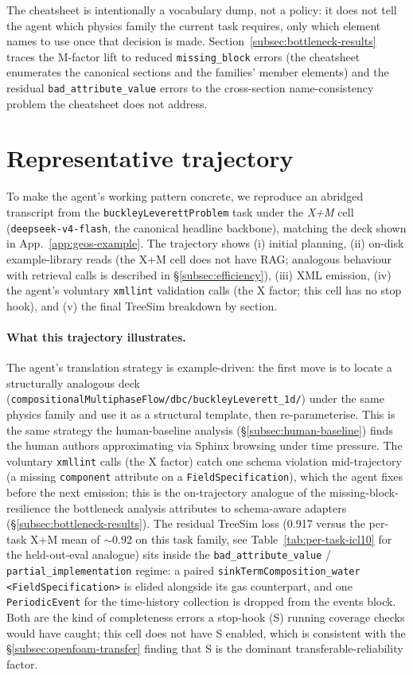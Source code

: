 \documentclass{article}
\newcommand{\promptinput}[2][]{%
  \VerbatimInput[
    fontsize=\footnotesize,
    breaklines=true,
    breakanywhere=true,
    breaksymbolright=\small$\hookrightarrow$,
    obeytabs=true,
    tabsize=2,
    frame=leftline,
    framerule=0.6pt,
    rulecolor=\color{gray},
    #1
  ]{#2}%
}
\begin{document}
The cheatsheet is intentionally a vocabulary dump, not a policy: it does not tell the agent which physics family the current task requires, only which element names to use once that decision is made. Section~\ref{subsec:bottleneck-results} traces the M-factor lift to reduced \texttt{missing\_block} errors (the cheatsheet enumerates the canonical sections and the families' member elements) and the residual \texttt{bad\_attribute\_value} errors to the cross-section name-consistency problem the cheatsheet does not address.


\section{Representative trajectory}
\label{app:case-study}

To make the agent's working pattern concrete, we reproduce an abridged transcript from the \texttt{buckleyLeverettProblem} task under the \emph{X+M} cell (\texttt{deepseek-v4-flash}, the canonical headline backbone), matching the deck shown in App.~\ref{app:geos-example}. The trajectory shows (i) initial planning, (ii) on-disk example-library reads (the X+M cell does not have RAG; analogous behaviour with retrieval calls is described in \S\ref{subsec:efficiency}), (iii) XML emission, (iv) the agent's voluntary \texttt{xmllint} validation calls (the X factor; this cell has no stop hook), and (v) the final TreeSim breakdown by section.

\promptinput{assets/trajectory_buckleyleverett_xm.txt}

\paragraph{What this trajectory illustrates.} The agent's translation strategy is example-driven: the first move is to locate a structurally analogous deck (\texttt{compositionalMultiphaseFlow/dbc/buckleyLeverett\_1d/}) under the same physics family and use it as a structural template, then re-parameterise. This is the same strategy the human-baseline analysis (\S\ref{subsec:human-baseline}) finds the human authors approximating via Sphinx browsing under time pressure. The voluntary \texttt{xmllint} calls (the X factor) catch one schema violation mid-trajectory (a missing \texttt{component} attribute on a \texttt{FieldSpecification}), which the agent fixes before the next emission; this is the on-trajectory analogue of the missing-block-resilience the bottleneck analysis attributes to schema-aware adapters (\S\ref{subsec:bottleneck-results}). The residual TreeSim loss (0.917 versus the per-task X+M mean of $\sim$0.92 on this task family, see Table~\ref{tab:per-task-icl10} for the held-out-eval analogue) sits inside the \texttt{bad\_attribute\_value} / \texttt{partial\_implementation} regime: a paired \texttt{sinkTermComposition\_water} \texttt{<FieldSpecification>} is elided alongside its gas counterpart, and one \texttt{PeriodicEvent} for the time-history collection is dropped from the events block. Both are the kind of completeness errors a stop-hook (S) running coverage checks would have caught; this cell does not have S enabled, which is consistent with the \S\ref{subsec:openfoam-transfer} finding that S is the dominant transferable-reliability factor.



% 
\end{document}
